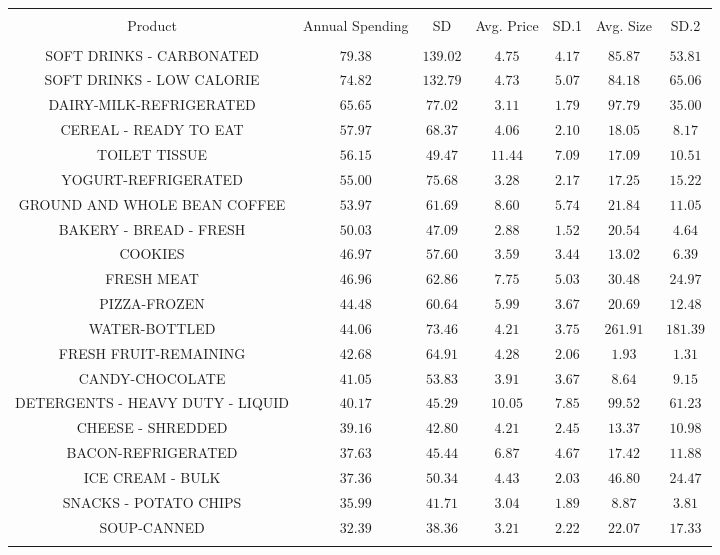 
\begin{table}[!htbp] \centering 
  \caption{} 
  \label{tab:homeScanProducts} 
\begin{tabular}{@{\extracolsep{5pt}} ccccccc} 
\\[-1.8ex]\hline 
\hline \\[-1.8ex] 
Product & Annual Spending & SD & Avg. Price & SD.1 & Avg. Size & SD.2 \\ 
\hline \\[-1.8ex] 
SOFT DRINKS - CARBONATED & $79.38$ & $139.02$ & $4.75$ & $4.17$ & $85.87$ & $53.81$ \\ 
SOFT DRINKS - LOW CALORIE & $74.82$ & $132.79$ & $4.73$ & $5.07$ & $84.18$ & $65.06$ \\ 
DAIRY-MILK-REFRIGERATED & $65.65$ & $77.02$ & $3.11$ & $1.79$ & $97.79$ & $35.00$ \\ 
CEREAL - READY TO EAT & $57.97$ & $68.37$ & $4.06$ & $2.10$ & $18.05$ & $8.17$ \\ 
TOILET TISSUE & $56.15$ & $49.47$ & $11.44$ & $7.09$ & $17.09$ & $10.51$ \\ 
YOGURT-REFRIGERATED & $55.00$ & $75.68$ & $3.28$ & $2.17$ & $17.25$ & $15.22$ \\ 
GROUND AND WHOLE BEAN COFFEE & $53.97$ & $61.69$ & $8.60$ & $5.74$ & $21.84$ & $11.05$ \\ 
BAKERY - BREAD - FRESH & $50.03$ & $47.09$ & $2.88$ & $1.52$ & $20.54$ & $4.64$ \\ 
COOKIES & $46.97$ & $57.60$ & $3.59$ & $3.44$ & $13.02$ & $6.39$ \\ 
FRESH MEAT & $46.96$ & $62.86$ & $7.75$ & $5.03$ & $30.48$ & $24.97$ \\ 
PIZZA-FROZEN & $44.48$ & $60.64$ & $5.99$ & $3.67$ & $20.69$ & $12.48$ \\ 
WATER-BOTTLED & $44.06$ & $73.46$ & $4.21$ & $3.75$ & $261.91$ & $181.39$ \\ 
FRESH FRUIT-REMAINING & $42.68$ & $64.91$ & $4.28$ & $2.06$ & $1.93$ & $1.31$ \\ 
CANDY-CHOCOLATE & $41.05$ & $53.83$ & $3.91$ & $3.67$ & $8.64$ & $9.15$ \\ 
DETERGENTS - HEAVY DUTY - LIQUID & $40.17$ & $45.29$ & $10.05$ & $7.85$ & $99.52$ & $61.23$ \\ 
CHEESE - SHREDDED & $39.16$ & $42.80$ & $4.21$ & $2.45$ & $13.37$ & $10.98$ \\ 
BACON-REFRIGERATED & $37.63$ & $45.44$ & $6.87$ & $4.67$ & $17.42$ & $11.88$ \\ 
ICE CREAM - BULK & $37.36$ & $50.34$ & $4.43$ & $2.03$ & $46.80$ & $24.47$ \\ 
SNACKS - POTATO CHIPS & $35.99$ & $41.71$ & $3.04$ & $1.89$ & $8.87$ & $3.81$ \\ 
SOUP-CANNED & $32.39$ & $38.36$ & $3.21$ & $2.22$ & $22.07$ & $17.33$ \\ 
\hline \\[-1.8ex] 
\end{tabular} 
\end{table} 
